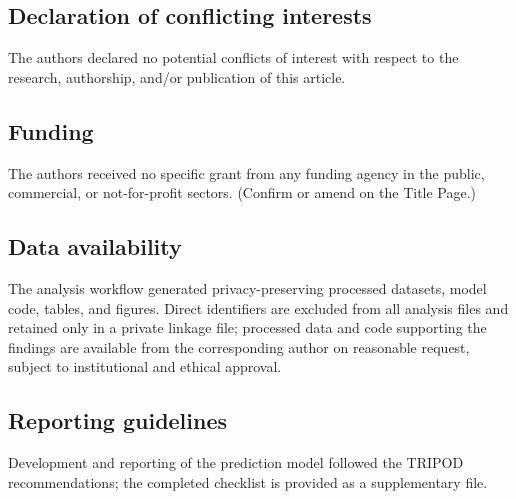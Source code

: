 \documentclass[11pt]{article}
\begin{document}
\subsection*{Declaration of conflicting interests}
The authors declared no potential conflicts of interest with respect to the
research, authorship, and/or publication of this article.

\subsection*{Funding}
The authors received no specific grant from any funding agency in the
public, commercial, or not-for-profit sectors. (Confirm or amend on the
Title Page.)

\subsection*{Data availability}
The analysis workflow generated privacy-preserving processed datasets,
model code, tables, and figures. Direct identifiers are excluded from all
analysis files and retained only in a private linkage file; processed data
and code supporting the findings are available from the corresponding
author on reasonable request, subject to institutional and ethical
approval.

\subsection*{Reporting guidelines}
Development and reporting of the prediction model followed the TRIPOD
recommendations; the completed checklist is provided as a supplementary
file.



\end{document}
